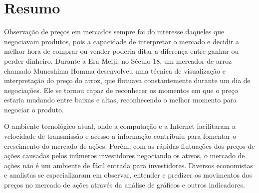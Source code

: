 \documentclass[12pt]{article}
\begin{document}
 




{}
\section*{Resumo}


Observação de preços em mercados sempre foi do interesse daqueles que negociavam produtos,
pois a capacidade de interpretar o mercado e decidir a melhor hora de comprar ou vender
poderia ditar a diferença entre ganhar ou perder dinheiro. Durante a Era Meiji, no Século 18,
um mercador de arroz chamado Muneshima Homma desenvolveu uma técnica de visualização e
interpretação do preço do arroz, que flutuava constantemente durante um dia de negociações.
Ele se tornou capaz de reconhecer os momentos em que o preço estaria mudando entre baixas e
altas, reconhecendo o melhor momento para negociar o produto.


O ambiente tecnológico atual, onde a computação e a Internet facilitaram a velocidade de
transmissão e acesso a informação contribuiu para fomentar o crescimento do mercado de ações.
Porém, com as rápidas flutuações dos preços de ações causadas pelos inúmeros investidores
negociando os ativos, o mercado de ações não é um ambiente de fácil entrada para investidores.
Diversos economistas e analistas se especializaram em observar, entender e predizer os
movimentos dos preços no mercado de ações através da análise de gráficos e outros indicadores.
\end{document}
